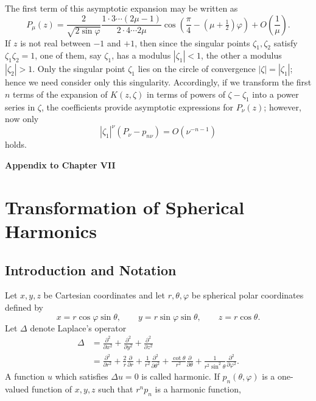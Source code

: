 The first term of this asymptotic expansion may be written as
\begin{equation}\tag{99}
P_\mu(z)=\frac{2}{\sqrt{2\sin\varphi}}
\frac{1\cdot3\cdots(2\mu-1)}{2\cdot4\cdots2\mu}
\cos\left(\frac\pi4-(\mu+\tfrac12)\varphi\right)+O\!\left(\frac1\mu\right).
\end{equation}
If $z$ is not real between $-1$ and $+1$, then since the singular points $\zeta_1,\zeta_2$ satisfy $\zeta_1\zeta_2=1$, one of them, say $\zeta_1$, has a modulus $|\zeta_1|<1$, the other a modulus $|\zeta_2|>1$. Only the singular point $\zeta_1$ lies on the circle of convergence $|\zeta|=|\zeta_1|$; hence we need consider only this singularity. Accordingly, if we transform the first $n$ terms of the expansion of $K(z,\zeta)$ in terms of powers of $\zeta-\zeta_1$ into a power series in $\zeta$, the coefficients provide asymptotic expressions for $P_\nu(z)$; however, now only
\[
|\zeta_1|^\nu(P_\nu-p_{n\nu})=O(\nu^{-n-1})
\]
holds.

\begin{center}
{\LARGE\bfseries\color{BellaInk} Appendix to Chapter VII}
\end{center}
\vspace{1em}

\section[Transformation of Spherical Harmonics]{Transformation of Spherical Harmonics\protect\footnotemark}

\subsection{Introduction and Notation}
Let $x,y,z$ be Cartesian coordinates and let $r,\theta,\varphi$ be spherical polar coordinates defined by
\begin{equation}\tag{100}
x=r\cos\varphi\sin\theta,\qquad y=r\sin\varphi\sin\theta,\qquad z=r\cos\theta.
\end{equation}
Let $\Delta$ denote Laplace's operator
\begin{equation}\tag{101}
\begin{aligned}
\Delta&=\frac{\partial^2}{\partial x^2}+\frac{\partial^2}{\partial y^2}+\frac{\partial^2}{\partial z^2}\\
&=\frac{\partial^2}{\partial r^2}+\frac2r\frac{\partial}{\partial r}
+\frac1{r^2}\frac{\partial^2}{\partial\theta^2}
+\frac{\cot\theta}{r^2}\frac{\partial}{\partial\theta}
+\frac1{r^2\sin^2\theta}\frac{\partial^2}{\partial\varphi^2}.
\end{aligned}
\end{equation}
A function $u$ which satisfies $\Delta u=0$ is called harmonic. If $p_n(\theta,\varphi)$ is a one-valued function of $x,y,z$ such that $r^np_n$ is a harmonic function,

